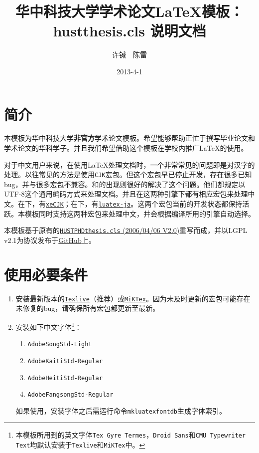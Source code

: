 \documentclass[12pt,a4paper,numbered,full]{l3doc}
\begin{document}
\title{华中科技大学学术论文\LaTeX{}模板：hustthesis.cls 说明文档}
\author{许铖~~陈雷}
\date{2013-4-1}

\maketitle

\tableofcontents

\section{简介}

本模板为华中科技大学\textbf{非官方}学术论文模板。希望能够帮助正忙于撰写毕业论文和学术论文的华科学子。并且我们希望借助这个模板在学校内推广\LaTeX{}的使用。

对于中文用户来说，在使用\LaTeX{}处理文档时，一个非常常见的问题即是对汉字的处理。以往常见的方法是使用\verb+CJK+宏包。但这个宏包早已停止开发，存在很多已知bug，并与很多宏包不兼容。\XeTeX{}和\LuaTeX{}的出现则很好的解决了这个问题。他们都规定以UTF-8这个通用编码方式来处理文档。并且在这两种引擎下都有相应宏包来处理中文。在\XeLaTeX{}下，有\href{http://mirrors.ctan.org/help/Catalogue/entries/xecjk.html}{\texttt{xeCJK}}；在\LuaLaTeX{}下，有\href{http://mirrors.ctan.org/help/Catalogue/entries/luatexja.html}{\texttt{luatex-ja}}。这两个宏包当前的开发状态都保持活跃。本模板同时支持这两种宏包来处理中文，并会根据编译所用的引擎自动选择。

本模板基于原有的\href{http://sourceforge.net/projects/hustthesis}{\texttt{HUSTPHDthesis.cls}  (2006/04/06 V2.0)}重写而成，并以LGPL v2.1为协议发布于\href{https://github.com/michael911009/HUSTThesis}{GitHub}上。

\section{使用必要条件}

\begin{enumerate}
    \item 安装最新版本的\href{http://www.tug.org/texlive/}{\texttt{Texlive}}（推荐）或\href{http://miktex.org/}{\texttt{MiKTex}}。因为未及时更新的宏包可能存在未修复的bug，请确保所有宏包都更新至最新。
    \item 安装如下中文字体\footnote{本模板所用到的英文字体\texttt{Tex Gyre Termes}，\texttt{Droid Sans}和\texttt{CMU Typewriter Text}均默认安装于\texttt{Texlive}和\texttt{MiKTex}中。}：
    \begin{enumerate}[label=\emph{\alph*})]
        \item \verb+AdobeSongStd-Light+
        \item \verb+AdobeKaitiStd-Regular+
        \item \verb+AdobeHeitiStd-Regular+
        \item \verb+AdobeFangsongStd-Regular+
    \end{enumerate}
    \begin{informationnote}
    如果使用\textnormal{\LuaTeX}，安装字体之后需运行命令\verb+mkluatexfontdb+生成字体索引。
    \end{informationnote}
\end{enumerate}
\end{document}
